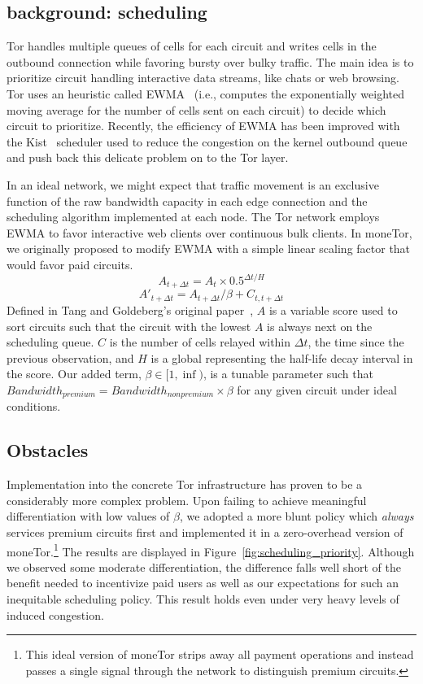 \subsection{background: scheduling}

Tor handles multiple queues of cells for each circuit and writes cells in the
outbound connection while favoring bursty over bulky traffic. The main idea is
to prioritize circuit handling interactive data streams, like chats or web
browsing. Tor uses an heuristic called EWMA~\cite{tang2010improved} (i.e.,
computes the exponentially weighted moving average for the number of cells sent
on each circuit) to decide which circuit to prioritize. Recently, the efficiency
of EWMA has been improved with the Kist~\cite{jansen2014never} scheduler used to
reduce the congestion on the kernel outbound queue and push back this delicate
problem on to the Tor layer.

In an ideal network, we might expect that traffic movement is an exclusive
function of the raw bandwidth capacity in each edge connection and the
scheduling algorithm implemented at each node.  The Tor network employs EWMA to
favor interactive web clients over continuous bulk clients. In moneTor, we
originally proposed to modify EWMA with a simple linear scaling factor that
would favor paid circuits.
\begin{equation}
  A_{t + \Delta t} = A_t \times 0.5^{\Delta t/H}
\end{equation}
\begin{equation}
  A'_{t + \Delta t} = A_{t + \Delta t} / \beta + C_{t, t + \Delta t}
\end{equation}
Defined in Tang and Goldeberg's original paper~\cite{tang2010improved}, $A$ is a variable score used to
sort circuits such that the circuit with the lowest $A$ is always next on the
scheduling queue. $C$ is the number of cells relayed within $\Delta t$, the time
since the previous observation, and $H$ is a global representing the half-life
decay interval in the score. Our added term, $\beta \in [1, \inf)$, is a tunable
parameter such that $Bandwidth_{premium} = Bandwidth_{nonpremium} \times \beta$
for any given circuit under ideal conditions.

\subsection{Obstacles}

Implementation into the concrete Tor infrastructure has proven to be a
considerably more complex problem. Upon failing to achieve meaningful
differentiation with low values of $\beta$, we adopted a more blunt policy which
\emph{always} services premium circuits first and implemented it in a
zero-overhead version of moneTor.\footnote{This ideal version of moneTor strips
  away all payment operations and instead passes a single signal through the
  network to distinguish premium circuits.} The results are displayed in
Figure~\ref{fig:scheduling_priority}. Although we observed some moderate
differentiation, the difference falls well short of the benefit needed to
incentivize paid users as well as our expectations for such an inequitable
scheduling policy. This result holds even under very heavy levels of induced
congestion.


